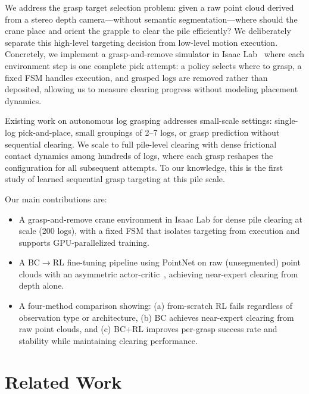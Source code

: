 \documentclass[conference]{IEEEtran}
\begin{document}
We address the grasp target selection problem: given a raw point cloud derived from a stereo depth camera---without semantic segmentation---where should the crane place and orient the grapple to clear the pile efficiently?
We deliberately separate this high-level targeting decision from low-level motion execution.
Concretely, we implement a grasp-and-remove simulator in Isaac Lab~\cite{mittal2023orbit} where each environment step is one complete pick attempt: a policy selects where to grasp, a fixed FSM handles execution, and grasped logs are removed rather than deposited, allowing us to measure clearing progress without modeling placement dynamics.

Existing work on autonomous log grasping addresses small-scale settings: single-log pick-and-place, small groupings of 2--7 logs, or grasp prediction without sequential clearing.
We scale to full pile-level clearing with dense frictional contact dynamics among hundreds of logs, where each grasp reshapes the configuration for all subsequent attempts.
To our knowledge, this is the first study of learned sequential grasp targeting at this pile scale.

Our main contributions are:
\begin{itemize}
    \item A grasp-and-remove crane environment in Isaac Lab for dense pile clearing at scale (200 logs), with a fixed FSM that isolates targeting from execution and supports GPU-parallelized training.
    \item A BC$\to$RL fine-tuning pipeline using PointNet on raw (unsegmented) point clouds with an asymmetric actor-critic~\cite{pinto2018asymmetric}, achieving near-expert clearing from depth alone.
    \item A four-method comparison showing: (a) from-scratch RL fails regardless of observation type or architecture, (b) BC achieves near-expert clearing from raw point clouds, and (c) BC+RL improves per-grasp success rate and stability while maintaining clearing performance.
\end{itemize}

\section{Related Work}
\end{document}
